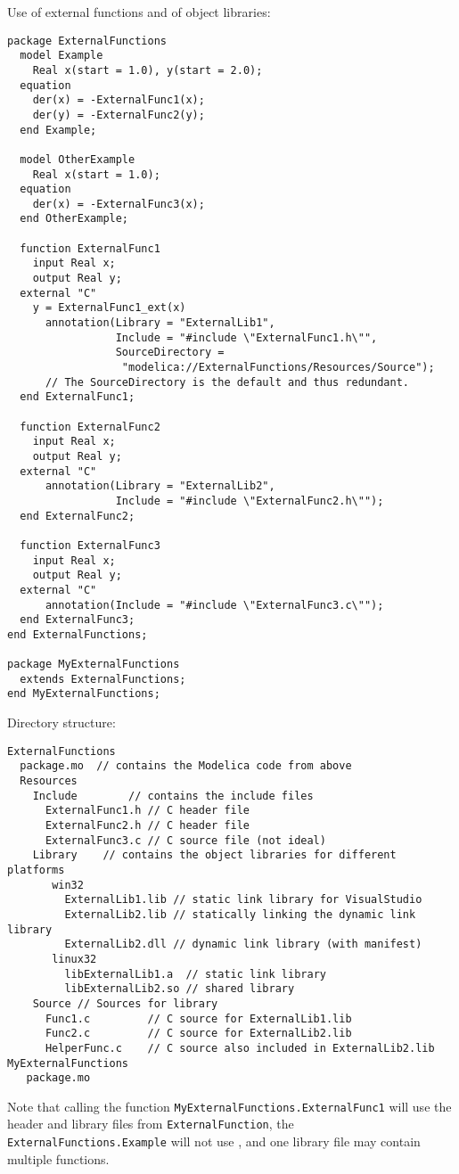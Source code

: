 \begin{example}
Use of external functions and of object libraries:
\begin{lstlisting}[language=modelica]
package ExternalFunctions
  model Example
    Real x(start = 1.0), y(start = 2.0);
  equation
    der(x) = -ExternalFunc1(x);
    der(y) = -ExternalFunc2(y);
  end Example;

  model OtherExample
    Real x(start = 1.0);
  equation
    der(x) = -ExternalFunc3(x);
  end OtherExample;

  function ExternalFunc1
    input Real x;
    output Real y;
  external "C"
    y = ExternalFunc1_ext(x)
      annotation(Library = "ExternalLib1",
                 Include = "#include \"ExternalFunc1.h\"",
                 SourceDirectory =
                  "modelica://ExternalFunctions/Resources/Source");
      // The SourceDirectory is the default and thus redundant.
  end ExternalFunc1;

  function ExternalFunc2
    input Real x;
    output Real y;
  external "C"
      annotation(Library = "ExternalLib2",
                 Include = "#include \"ExternalFunc2.h\"");
  end ExternalFunc2;

  function ExternalFunc3
    input Real x;
    output Real y;
  external "C"
      annotation(Include = "#include \"ExternalFunc3.c\"");
  end ExternalFunc3;
end ExternalFunctions;

package MyExternalFunctions
  extends ExternalFunctions;
end MyExternalFunctions;
\end{lstlisting}
Directory structure:
\begin{lstlisting}[language=modelica]
ExternalFunctions
  package.mo  // contains the Modelica code from above
  Resources
    Include        // contains the include files
      ExternalFunc1.h // C header file
      ExternalFunc2.h // C header file
      ExternalFunc3.c // C source file (not ideal)
    Library    // contains the object libraries for different platforms
       win32
         ExternalLib1.lib // static link library for VisualStudio
         ExternalLib2.lib // statically linking the dynamic link library
         ExternalLib2.dll // dynamic link library (with manifest)
       linux32
         libExternalLib1.a  // static link library
         libExternalLib2.so // shared library
    Source // Sources for library
      Func1.c         // C source for ExternalLib1.lib
      Func2.c         // C source for ExternalLib2.lib
      HelperFunc.c    // C source also included in ExternalLib2.lib
MyExternalFunctions
   package.mo
\end{lstlisting}
Note that calling the function \lstinline!MyExternalFunctions.ExternalFunc1! will use
the header and library files from \lstinline!ExternalFunction!, the \lstinline!ExternalFunctions.Example! will not use ,
and one library file may contain multiple functions.


\end{example}
